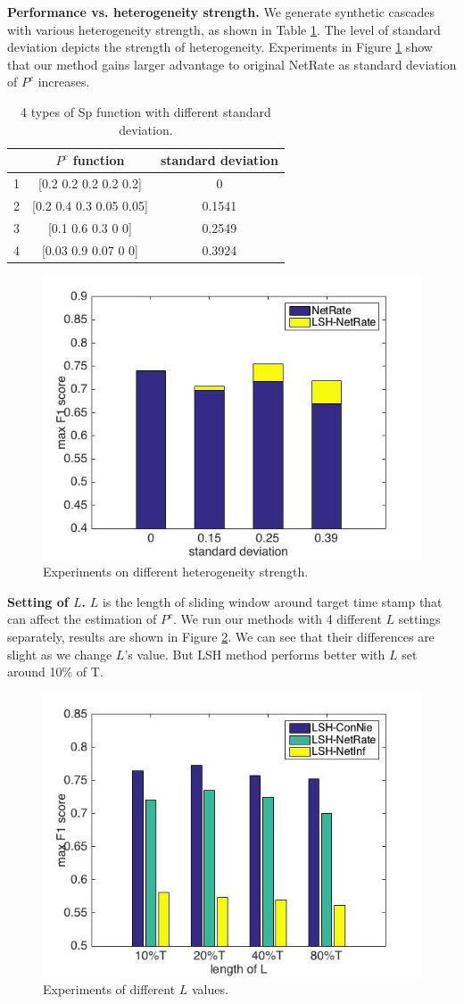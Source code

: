 \textbf{Performance vs. heterogeneity strength.} We generate synthetic cascades with various heterogeneity strength, as shown in Table \ref{tab:Spfunction}. The level of standard deviation depicts the strength of heterogeneity. Experiments in Figure \ref{fig:Hete} show that our method gains larger advantage to original NetRate as standard deviation of $P^c$ increases.
\begin{table}[H]
\caption{4 types of Sp function with different standard deviation.}
\begin{tabular}{c|c|c}
 & $P^c$ function & standard deviation \\
\hline
1 & [0.2 0.2 0.2 0.2 0.2] & 0\\
2 & [0.2 0.4 0.3 0.05 0.05] & 0.1541\\
3 & [0.1 0.6 0.3 0 0] & 0.2549\\
4 & [0.03 0.9 0.07 0 0] & 0.3924
\end{tabular}\label{tab:Spfunction}
\end{table}
\begin{figure}[H]
\centerline{
\includegraphics[width=0.75\linewidth]{figures/HeteroStrength.jpg}}
\caption{Experiments on different heterogeneity strength. }\label{fig:Hete}
\end{figure}
\textbf{Setting of $L$.} $L$ is the length of sliding window around target time stamp that can affect the estimation of $P^c$. We run our methods with 4 different $L$ settings separately, results are shown in Figure \ref{fig:SetLAG}. We can see that their differences are slight as we change $L$'s value. But LSH method performs better with $L$ set around 10\% of T.
\begin{figure}[H]
\centerline{
\includegraphics[width=0.75\linewidth]{figures/SettingLAG.jpg}}
\caption{Experiments of different $L$ values. }\label{fig:SetLAG}
\end{figure}
